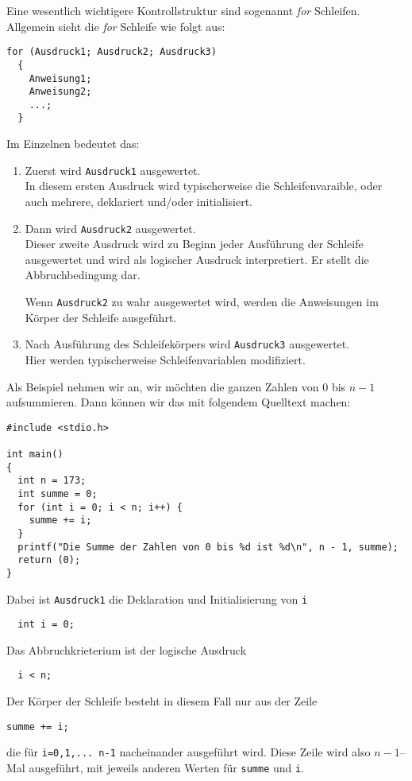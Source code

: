 Eine wesentlich wichtigere Kontrollstruktur sind sogenannt \emph{for} Schleifen.
Allgemein sieht die \emph{for} Schleife wie folgt aus:
\begin{lstlisting}
for (Ausdruck1; Ausdruck2; Ausdruck3)
  {
    Anweisung1;
    Anweisung2;
    ...;
  }
\end{lstlisting}
Im Einzelnen bedeutet das:
\begin{enumerate}
\item Zuerst wird \texttt{Ausdruck1} ausgewertet.\\
  In diesem ersten Ausdruck wird typischerweise die Schleifenvaraible, oder auch mehrere, deklariert und/oder initialisiert. 
\item Dann wird \texttt{Ausdruck2} ausgewertet.\\
  Dieser zweite Ausdruck wird zu Beginn jeder Ausführung der Schleife ausgewertet und wird als logischer Ausdruck interpretiert.
  Er stellt die Abbruchbedingung dar.

  Wenn \texttt{Ausdruck2} zu wahr ausgewertet wird, werden die Anweisungen im Körper der Schleife ausgeführt. 
\item Nach Ausführung des Schleifekörpers wird \texttt{Ausdruck3} ausgewertet.\\
  Hier werden typischerweise Schleifenvariablen modifiziert.
\end{enumerate}
Als Beispiel nehmen wir an, wir möchten die ganzen Zahlen von $0$ bis $n-1$ aufsummieren.
Dann können wir das mit folgendem Quelltext machen:
\begin{lstlisting}
#include <stdio.h>

int main()
{
  int n = 173;
  int summe = 0;
  for (int i = 0; i < n; i++) {
    summe += i;
  }
  printf("Die Summe der Zahlen von 0 bis %d ist %d\n", n - 1, summe);
  return (0);
}
\end{lstlisting}
Dabei ist \texttt{Ausdruck1} die Deklaration und Initialisierung von \verb|i|
\begin{lstlisting}
  int i = 0;
\end{lstlisting}
Das Abbruchkrieterium ist der logische Ausdruck
\begin{lstlisting}
  i < n;
\end{lstlisting}
Der Körper der Schleife besteht in diesem Fall nur aus der Zeile
\begin{lstlisting}
summe += i;
\end{lstlisting}
die für \verb|i=0,1,... n-1| nacheinander ausgeführt wird.
Diese Zeile wird also $n-1$--Mal ausgeführt, mit jeweils anderen Werten für \verb|summe| und \verb|i|.
